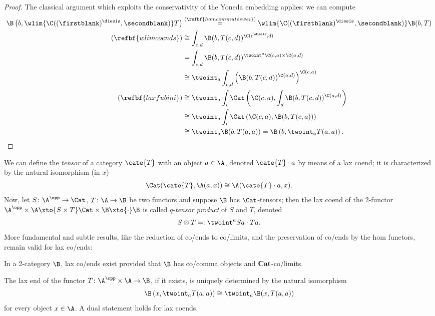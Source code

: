 \begin{proof}
The classical argument which exploits the conservativity of the Yoneda embedding applies: we can compute
\begin{align*}
\B\left( b, \wlim{\C((\firstblank)^\diesis,\secondblank)}T \right) & \overset{(\refbf{homcommuteswei})}{=} \wlim{\C((\firstblank)^\diesis,\secondblank)} \B(b, T) \\
(\refbf{wlimcoends}) & \cong \int_{c,d} \B(b, T(c,d))^{\C(c^\diesis,d)}\\
& = \int_{c,d} \B(b, T(c,d))^{\twoint^a \C(c,a)\times \C(a, d)} \\ 
& \cong \twoint_a \int_{c,d} \left(\B(b, T(c,d))^{\C(a,d)} \right)^{\C(c,a)} \\
(\refbf{laxfubini})& \cong  \twoint_a \int_c \Cat\left( \C(c,a), \int_d \B(b, T(c,d))^{\C(a,d)} \right)\\
& \cong \twoint_a \int_c \Cat\left( \C(c,a), \B(b, T(c,a)) \right) \\
& \cong \twoint_a \B(b, T(a,a)) = \B\left(b, \twoint_a T(a,a)\right).\qedhere
\end{align*}
\end{proof}
We can define the \emph{tensor} of a category $\cate{T}$ with an object $a\in\A$, denoted $\cate{T}\cdot a$ by means of a lax coend; it is characterized by the natural isomorphism (in $x$)
\[
\Cat(\cate{T}, \A(a, x))\cong \A(\cate{T}\cdot a, x).
\]
Now, let $S\colon \A^\opp\to \Cat$, $T\colon \A\to \B$ be two functors and suppose $\B$ has $\Cat$-tensors; then the lax coend of the 2-functor $\A^\opp\times \A\xto{S\times T} \Cat\times\B\xto{\cdot} \B$ is called $q$-\emph{tensor product} of $S$ and $T$, denoted
\[
S\otimes T =: \twoint^a Sa\cdot Ta.
\]
More fundamental and subtle results, like the reduction of co/ends to co/limits, and the preservation of co/ends by the hom functors, remain valid for lax co/ends: %
\begin{theorem}
In a 2-category $\B$, lax co/ends exist provided that $\B$ has co/comma objects and $\bf Cat$-co/limits.
\end{theorem}
\begin{theorem}
The lax end of the functor $T\colon \A^\opp\times \A \to \B$, if it exists, is uniquely determined by the natural isomorphism
\[
\B\left(x, \twoint_a T(a,a)\right)\cong \twoint_a \B(x, T(a,a))
\]
for every object $x\in \A$. A dual statement holds for lax coends.
\end{theorem}
